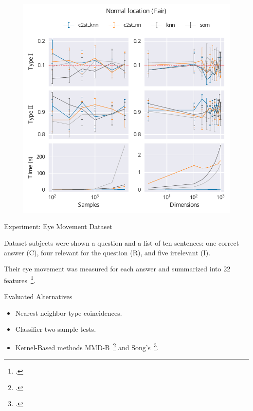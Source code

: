 \documentclass[10pt]{beamer}
\begin{document}
\begin{frame}{}
\begin{figure}
    \centering
    \includegraphics[height=\textheight]{normal_location_fair}
\end{figure}
\end{frame}

\begin{frame}{Experiment: Eye Movement Dataset}
    \begin{block}{Dataset}
         subjects were shown a question and a list of ten 
        sentences: one correct answer (C), four relevant for the question (R), and five irrelevant (I).
        
        Their eye movement was measured for each answer and summarized into 22 features~\footcite{salojarvi2005inferring}.
    \end{block}
    \begin{block}{Evaluated Alternatives}
        \smallskip
        \begin{itemize}
            \item Nearest neighbor type coincidences.
            \item Classifier two-sample tests.
            \item Kernel-Based methods MMD-B~\footcite{zaremba2013b} and Song's~\footcite{song2021fast}.
        \end{itemize}
    \end{block}
\end{frame}
\end{document}
